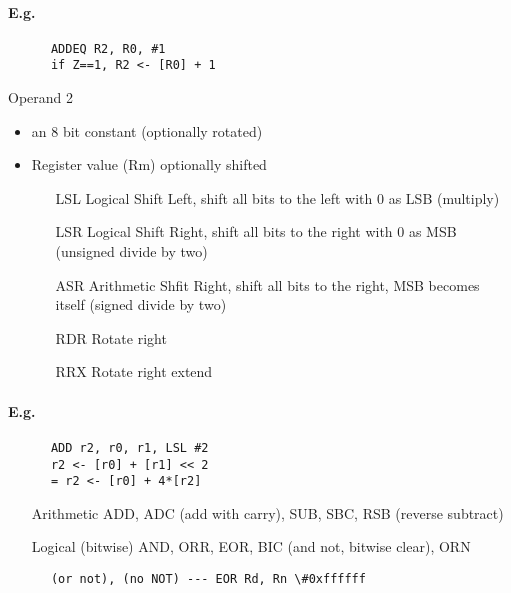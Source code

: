 \documentclass[12pt]{report}
\begin{document}
    \paragraph{E.g.}
    \begin{lstlisting}
      ADDEQ R2, R0, #1
      if Z==1, R2 <- [R0] + 1
    \end{lstlisting}

    Operand 2
    \begin{itemize}
      \item an 8 bit constant (optionally rotated)
      \item Register value (Rm) optionally shifted
      \begin{itemize}
        \item[LSL] Logical Shift Left, shift all bits to the left with 0 as LSB
          (multiply)
        \item[LSR] Logical Shift Right, shift all bits to the right with 0 as
          MSB (unsigned divide by two)
        \item[ASR] Arithmetic Shfit Right, shift all bits to the right, MSB
          becomes itself (signed divide by two)
        \item[RDR] Rotate right
        \item[RRX] Rotate right extend
      \end{itemize}
    \end{itemize}
    \paragraph{E.g.}
    \begin{lstlisting}
      ADD r2, r0, r1, LSL #2
      r2 <- [r0] + [r1] << 2
      = r2 <- [r0] + 4*[r2]
    \end{lstlisting}

    \begin{itemize}
      \item[Arithmetic] ADD, ADC (add with carry), SUB, SBC, RSB (reverse
      subtract)
      \item[Logical] (bitwise) AND, ORR, EOR, BIC (and not, bitwise clear), ORN
    \end{itemize}
    \begin{lstlisting}
      (or not), (no NOT) --- EOR Rd, Rn \#0xffffff
    \end{lstlisting}
\end{document}
